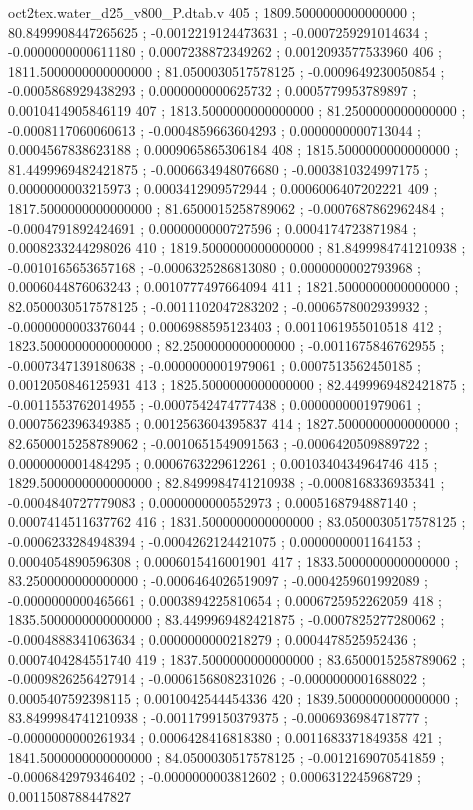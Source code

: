 \begin{filecontents}[overwrite]{oct2tex.water_d25_v800_P.dtab.v}
405 ; 1809.5000000000000000 ; 80.8499908447265625 ; -0.0012219124473631 ; -0.0007259291014634 ; -0.0000000000611180 ; 0.0007238872349262 ; 0.0012093577533960
406 ; 1811.5000000000000000 ; 81.0500030517578125 ; -0.0009649230050854 ; -0.0005868929438293 ; 0.0000000000625732 ; 0.0005779953789897 ; 0.0010414905846119
407 ; 1813.5000000000000000 ; 81.2500000000000000 ; -0.0008117060060613 ; -0.0004859663604293 ; 0.0000000000713044 ; 0.0004567838623188 ; 0.0009065865306184
408 ; 1815.5000000000000000 ; 81.4499969482421875 ; -0.0006634948076680 ; -0.0003810324997175 ; 0.0000000003215973 ; 0.0003412909572944 ; 0.0006006407202221
409 ; 1817.5000000000000000 ; 81.6500015258789062 ; -0.0007687862962484 ; -0.0004791892424691 ; 0.0000000000727596 ; 0.0004174723871984 ; 0.0008233244298026
410 ; 1819.5000000000000000 ; 81.8499984741210938 ; -0.0010165653657168 ; -0.0006325286813080 ; 0.0000000002793968 ; 0.0006044876063243 ; 0.0010777497664094
411 ; 1821.5000000000000000 ; 82.0500030517578125 ; -0.0011102047283202 ; -0.0006578002939932 ; -0.0000000003376044 ; 0.0006988595123403 ; 0.0011061955010518
412 ; 1823.5000000000000000 ; 82.2500000000000000 ; -0.0011675846762955 ; -0.0007347139180638 ; -0.0000000001979061 ; 0.0007513562450185 ; 0.0012050846125931
413 ; 1825.5000000000000000 ; 82.4499969482421875 ; -0.0011553762014955 ; -0.0007542474777438 ; 0.0000000001979061 ; 0.0007562396349385 ; 0.0012563604395837
414 ; 1827.5000000000000000 ; 82.6500015258789062 ; -0.0010651549091563 ; -0.0006420509889722 ; 0.0000000001484295 ; 0.0006763229612261 ; 0.0010340434964746
415 ; 1829.5000000000000000 ; 82.8499984741210938 ; -0.0008168336935341 ; -0.0004840727779083 ; 0.0000000000552973 ; 0.0005168794887140 ; 0.0007414511637762
416 ; 1831.5000000000000000 ; 83.0500030517578125 ; -0.0006233284948394 ; -0.0004262124421075 ; 0.0000000001164153 ; 0.0004054890596308 ; 0.0006015416001901
417 ; 1833.5000000000000000 ; 83.2500000000000000 ; -0.0006464026519097 ; -0.0004259601992089 ; -0.0000000000465661 ; 0.0003894225810654 ; 0.0006725952262059
418 ; 1835.5000000000000000 ; 83.4499969482421875 ; -0.0007825277280062 ; -0.0004888341063634 ; 0.0000000000218279 ; 0.0004478525952436 ; 0.0007404284551740
419 ; 1837.5000000000000000 ; 83.6500015258789062 ; -0.0009826256427914 ; -0.0006156808231026 ; -0.0000000001688022 ; 0.0005407592398115 ; 0.0010042544454336
420 ; 1839.5000000000000000 ; 83.8499984741210938 ; -0.0011799150379375 ; -0.0006936984718777 ; -0.0000000000261934 ; 0.0006428416818380 ; 0.0011683371849358
421 ; 1841.5000000000000000 ; 84.0500030517578125 ; -0.0012169070541859 ; -0.0006842979346402 ; -0.0000000003812602 ; 0.0006312245968729 ; 0.0011508788447827

\end{filecontents}
